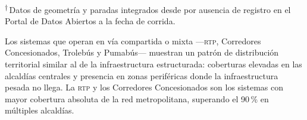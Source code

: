 \begin{table}[H]
    \noindent\textsuperscript{†}\,Datos de geometría y paradas integrados
    desde  \citep{osm2012} por ausencia de registro
    en el Portal de Datos Abiertos a la fecha de corrida.

\end{table}

\label{subsubsec:cobertura-superficie}

Los sistemas que operan en vía compartida o mixta —\textsc{rtp}, Corredores
Concesionados, Trolebús y Pumabús— muestran un patrón de distribución
territorial similar al de la infraestructura estructurada: coberturas elevadas
en las alcaldías centrales y presencia en zonas periféricas donde la
infraestructura pesada no llega. La \textsc{rtp} y los Corredores Concesionados
son los sistemas con mayor cobertura absoluta de la red metropolitana, superando
el 90\,\% en múltiples alcaldías.

